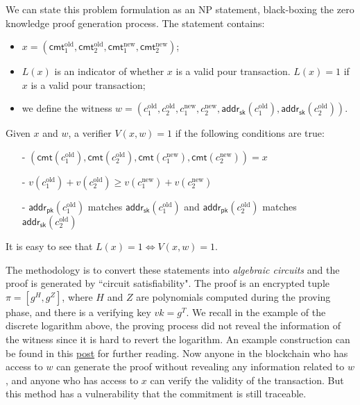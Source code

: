 \documentclass[a4paper]{article}
\newcommand{\cmt}{\textsf{cmt}}
\newcommand{\adpk}{\textsf{addr}_{\textsf{pk}}}
\newcommand{\adsk}{\textsf{addr}_{\textsf{sk}}}
\newcommand{\pramod}[1]{{\color{red}
\footnotesize[Pramod: #1] }}
\begin{document}
We can state this problem formulation as an NP statement, black-boxing   the zero knowledge proof generation process. The statement contains:
\begin{itemize}
    \item $x = (\cmt_1^{\text{old}}, \cmt_2^{\text{old}}, \cmt_1^{\text{new}}, \cmt_2^{\text{new}})$; 
    \item $L(x)$ is an indicator of whether $x$ is a valid pour transaction. $L(x)=1$ if $x$ is a valid pour transaction;
    \item we define the witness $w = (c_1^{\text{old}}, c_2^{\text{old}}, c_1^{\text{new}}, c_2^{\text{new}}, \adsk(c_1^{\text{old}}), \adsk(c_2^{\text{old}}))$.
\end{itemize}   Given $x$ and $w$, a verifier $V(x,w)=1$ if the following conditions are true:
\begin{itemize}
    \item [-] $(\cmt(c_1^{\text{old}}), \cmt(c_2^{\text{old}}), \cmt(c_1^{\text{new}}), \cmt(c_2^{\text{new}})) = x$
    \item [-] $v(c_1^{\text{old}}) + v(c_2^{\text{old}}) \ge v(c_1^{\text{new}}) + v(c_2^{\text{new}})$
    \item [-] $\adpk(c_1^{\text{old}})$ matches $\adsk(c_1^{\text{old}})$ and $\adpk(c_2^{\text{old}})$ matches $\adsk(c_2^{\text{old}})$
\end{itemize}
It is easy to see that $L(x)=1\iff V(x,w)=1$.

The methodology is to convert these statements into {\em algebraic circuits} and the proof is generated by ``circuit satisfiability". The proof is an encrypted tuple $\pi = [g^H, g^Z]$, where $H$ and $Z$ are polynomials computed during the proving phase, and there is a verifying key $vk = g^T$. We recall in the example of the discrete logarithm  above, the proving process did not reveal the information of the witness since it is hard to revert the logarithm. An example construction can be found in this \href{https://medium.com/@VitalikButerin/quadratic-arithmetic-programs-from-zero-to-hero-f6d558cea649}{post} for further reading. %
Now anyone in the blockchain who has access to $w$ can generate the proof without revealing any information related to $w$, and anyone who has access to $x$ can verify the validity of the transaction. But this method has a vulnerability that the commitment is still traceable.
\end{document}
